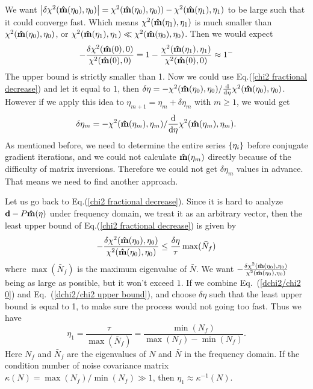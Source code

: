 \documentclass[11pt, letterpaper]{article}
\newcommand{\vbd}{\vb{d}}
\newcommand{\inv}[1]{#1^{-1}}
\newcommand{\hatm}{\vb{\hat{m}}}
\newcommand{\Nbar}{\bar{N}}
\begin{document}
We want $\qty|\delta \chi^2(\hatm(\eta_0),\eta_0)| = \chi^2(\hatm(\eta_0),\eta_0)) - \chi^2(\hatm(\eta_1), \eta_1)$
to be large such that it could converge fast.
Which means $\chi^2(\hatm(\eta_1), \eta_1)$ is much smaller than $\chi^2(\hatm(\eta_0), \eta_0)$,
or $\chi^2(\hatm(\eta_1), \eta_1) \ll \chi^2(\hatm(\eta_0), \eta_0)$.
Then we would expect
\begin{align}
-\frac{\delta\chi^2(\hatm(0),0)}{\chi^2(\hatm(0),0)}
= 1 - \frac{\chi^2(\hatm(\eta_1),\eta_1)}{\chi^2(\hatm(0),0)}
\approx 1^-
\label{dchi2/chi2 0}
\end{align}
The upper bound is strictly smaller than 1.
Now we could use Eq.(\ref{chi2 fractional decrease}) and let it equal to $1$, then
$\delta\eta=-\chi^2(\hatm(\eta_0), \eta_0)/\dv{\eta}\chi^2(\hatm(\eta_0),\eta_0)$.
However if we apply this idea to $\eta_{m+1} = \eta_m + \delta \eta_m$ with $m \geq 1$, we would get
\begin{align}
\delta\eta_m = -\chi^2(\hatm(\eta_m), \eta_m)/\dv{\eta}\chi^2(\hatm(\eta_m),\eta_m).
\label{delta eta update}
\end{align}
As mentioned before, we need to determine the entire series $\qty{\eta_i}$ before conjugate gradient iterations,
and we could not calculate $\hatm(\eta_m)$ directly because of the difficulty of matrix inversions.
Therefore we could not get $\delta \eta_m$ values in advance.
That means we need to find another approach.

Let us go back to Eq.(\ref{chi2 fractional decrease}).
Since it is hard to analyze $\vbd - P\hatm(\eta)$ under frequency domain,
we treat it as an arbitrary vector, then the least upper bound of Eq.(\ref{chi2 fractional decrease}) is given by
\begin{align}
-\frac{\delta \chi^2(\hatm(\eta_0), \eta_0)}{\chi^2(\hatm(\eta_0), \eta_0)} 
\leq \frac{\delta \eta} {\tau} \max(\Nbar_f)
\label{dchi2/chi2 upper bound}
\end{align}
where $\max(\Nbar_f)$ is the maximum eigenvalue of $\Nbar$.
We want $ -\frac{\delta \chi^2(\hatm(\eta_0), \eta_0)}{\chi^2(\hatm(\eta_0), \eta_0)}$ being as large as possible,
but it won't exceed $1$.
If we combine Eq.~(\ref{dchi2/chi2 0}) and Eq.~(\ref{dchi2/chi2 upper bound}),
and choose $\delta \eta$ such that the least upper bound is equal to 1,
to make sure the process would not going too fast.
Thus we have
\begin{equation}
\eta_1 = \frac{\tau}{\max(\Nbar_f)} = \frac{\min(N_f)}{\max(N_f) - \min(N_f)}.
\end{equation}
Here $N_f$ and $\Nbar_f$ are the eigenvalues of $N$ and $\Nbar$ in the frequency
domain.
If the condition number of noise covariance matrix
$\kappa(N) = \max(N_f)/\min(N_f) \gg 1$,
then $\eta_1 \approx \inv{\kappa} (N)$.
\end{document}
